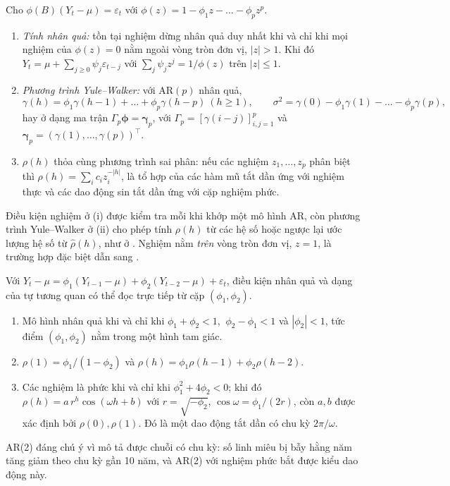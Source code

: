 \begin{kq}
Cho $\phi(B)(Y_t-\mu)=\varepsilon_t$ với $\phi(z)=1-\phi_1z-\dots-\phi_pz^p$.
\begin{enumerate}[label=(\roman*),leftmargin=*,itemsep=1pt]
\item \emph{Tính nhân quả:} tồn tại nghiệm dừng nhân quả duy nhất khi và chỉ khi mọi nghiệm của $\phi(z)=0$ nằm ngoài vòng tròn đơn vị, $|z|>1$. Khi đó $Y_t=\mu+\sum_{j\ge0}\psi_j\varepsilon_{t-j}$ với $\sum_j\psi_jz^j=1/\phi(z)$ trên $|z|\le1$.
\item \emph{Phương trình Yule--Walker:} với AR$(p)$ nhân quả,
\[
\gamma(h)=\phi_1\gamma(h-1)+\dots+\phi_p\gamma(h-p)\ (h\ge1),\qquad \sigma^2=\gamma(0)-\phi_1\gamma(1)-\dots-\phi_p\gamma(p),
\]
hay ở dạng ma trận $\Gamma_p\boldsymbol\phi=\boldsymbol\gamma_p$, với $\Gamma_p=[\gamma(i-j)]_{i,j=1}^{p}$ và $\boldsymbol\gamma_p=(\gamma(1),\dots,\gamma(p))^\top$.
\item $\rho(h)$ thỏa cùng phương trình sai phân: nếu các nghiệm $z_1,\dots,z_p$ phân biệt thì $\rho(h)=\sum_ic_iz_i^{-|h|}$, là tổ hợp của các hàm mũ tắt dần ứng với nghiệm thực và các dao động sin tắt dần ứng với cặp nghiệm phức.
\end{enumerate}
\end{kq}
Điều kiện nghiệm ở (i) được kiểm tra mỗi khi khớp một mô hình AR, còn phương trình Yule--Walker ở (ii) cho phép tính $\rho(h)$ từ các hệ số hoặc ngược lại ước lượng hệ số từ $\hat\rho(h)$, như ở . Nghiệm nằm \emph{trên} vòng tròn đơn vị, $z=1$, là trường hợp đặc biệt dẫn sang .

Với $Y_t-\mu=\phi_1(Y_{t-1}-\mu)+\phi_2(Y_{t-2}-\mu)+\varepsilon_t$, điều kiện nhân quả và dạng của tự tương quan có thể đọc trực tiếp từ cặp $(\phi_1,\phi_2)$.
\begin{kq}
\begin{enumerate}[label=(\roman*),leftmargin=*,itemsep=1pt]
\item Mô hình nhân quả khi và chỉ khi $\phi_1+\phi_2<1$, $\ \phi_2-\phi_1<1$ và $|\phi_2|<1$, tức điểm $(\phi_1,\phi_2)$ nằm trong một hình tam giác.
\item $\rho(1)=\phi_1/(1-\phi_2)$ và $\rho(h)=\phi_1\rho(h-1)+\phi_2\rho(h-2)$.
\item Các nghiệm là phức khi và chỉ khi $\phi_1^2+4\phi_2<0$; khi đó $\rho(h)=a\,r^h\cos(\omega h+b)$ với $r=\sqrt{-\phi_2}$, $\cos\omega=\phi_1/(2r)$, còn $a,b$ được xác định bởi $\rho(0),\rho(1)$. Đó là một dao động tắt dần có chu kỳ $2\pi/\omega$.
\end{enumerate}
\end{kq}
AR(2) đáng chú ý vì mô tả được chuỗi có chu kỳ: số linh miêu bị bẫy hằng năm tăng giảm theo chu kỳ gần 10 năm, và AR(2) với nghiệm phức bắt được kiểu dao động này.

